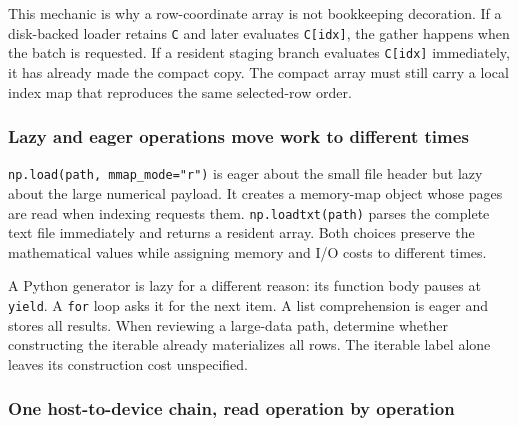 \documentclass[10pt,aps,prd,twocolumn,nofootinbib]{revtex4-2}
\newcommand{\code}[1]{\texttt{#1}}
\begin{document}
This mechanic is why a row-coordinate array is not bookkeeping decoration.
If a disk-backed loader retains \code{C} and later evaluates
\code{C[idx]}, the gather happens when the batch is requested.  If a
resident staging branch evaluates \code{C[idx]} immediately, it has already
made the compact copy.  The compact array must still carry a local index map
that reproduces the same selected-row order.

\subsubsection{Lazy and eager operations move work to different times}

\code{np.load(path, mmap\_mode="r")} is eager about the small file header but
lazy about the large numerical payload.  It creates a memory-map object whose
pages are read when indexing requests them.  \code{np.loadtxt(path)} parses
the complete text file immediately and returns a resident array.  Both choices
preserve the mathematical values while assigning memory and I/O costs to
different times.

A Python generator is lazy for a different reason: its function body pauses
at \code{yield}.  A \code{for} loop asks it for the next item.  A list
comprehension is eager and stores all results.  When reviewing a large-data
path, determine whether constructing the iterable already materializes all
rows.  The iterable label alone leaves its construction cost unspecified.

\subsubsection{One host-to-device chain, read operation by operation}
\end{document}
